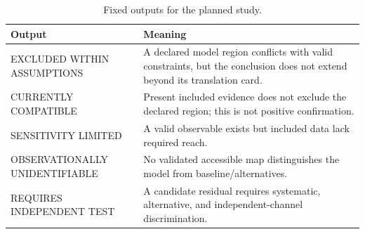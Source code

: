 \documentclass[conference]{IEEEtran}
\begin{document}
\begin{table}[t]
\caption{Fixed outputs for the planned study.}
\label{tab:outputs}
\centering
\scriptsize
\setlength{\tabcolsep}{2.5pt}
\begin{tabular}{p{} p{}}
\toprule
\textbf{Output} & \textbf{Meaning} \\
\midrule
EXCLUDED WITHIN ASSUMPTIONS & A declared model region conflicts with valid constraints, but the conclusion does not extend beyond its translation card. \\
CURRENTLY COMPATIBLE & Present included evidence does not exclude the declared region; this is not positive confirmation. \\
SENSITIVITY LIMITED & A valid observable exists but included data lack required reach. \\
OBSERVATIONALLY UNIDENTIFIABLE & No validated accessible map distinguishes the model from baseline/alternatives. \\
REQUIRES INDEPENDENT TEST & A candidate residual requires systematic, alternative, and independent-channel discrimination. \\
\bottomrule
\end{tabular}
\end{table}
\end{document}
